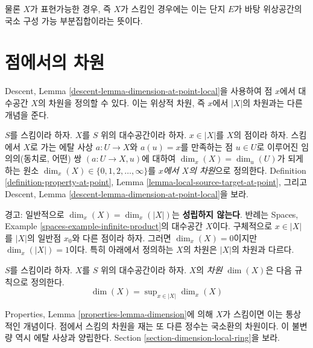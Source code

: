 \noindent
물론 $X$가 표현가능한 경우, 즉 $X$가 스킴인 경우에는 이는 단지
$E$가 바탕 위상공간의 국소 구성 가능 부분집합이라는 뜻이다.







\section{점에서의 차원}
\label{section-dimension}

\noindent
Descent, Lemma \ref{descent-lemma-dimension-at-point-local}을 사용하여
점 $x$에서 대수공간 $X$의 차원을 정의할 수 있다. 이는 위상적 차원,
즉 $x$에서 $|X|$의 차원과는 다른 개념을 준다.

\begin{definition}
\label{definition-dimension-at-point}
$S$를 스킴이라 하자.
$X$를 $S$ 위의 대수공간이라 하자.
$x \in |X|$를 $X$의 점이라 하자.
스킴에서 $X$로 가는 에탈 사상 $a : U \to X$와 $a(u) = x$를 만족하는
점 $u \in U$로 이루어진 임의의(동치로, 어떤) 쌍
$(a : U \to X, u)$에 대하여 $\dim_x(X) = \dim_u(U)$가 되게 하는 원소
$\dim_x(X) \in \{0, 1, 2, \ldots, \infty\}$를
{\it $x$에서 $X$의 차원}으로 정의한다. Definition
\ref{definition-property-at-point}, Lemma
\ref{lemma-local-source-target-at-point}, 그리고 Descent, Lemma
\ref{descent-lemma-dimension-at-point-local}을 보라.
\end{definition}

\noindent
경고: 일반적으로 $\dim_x(X) = \dim_x(|X|)$는 {\bf 성립하지 않는다}.
반례는 Spaces, Example \ref{spaces-example-infinite-product}의
대수공간 $X$이다. 구체적으로 $x \in |X|$를 $|X|$의 일반점 $x_0$와
다른 점이라 하자. 그러면 $\dim_x(X) = 0$이지만
$\dim_x(|X|) = 1$이다. 특히 아래에서 정의하는 $X$의 차원은
$|X|$의 차원과 다르다.

\begin{definition}
\label{definition-dimension}
$S$를 스킴이라 하자. $X$를 $S$ 위의 대수공간이라 하자.
$X$의 {\it 차원} $\dim(X)$은 다음 규칙으로 정의한다.
$$
\dim(X) = \sup\nolimits_{x \in |X|} \dim_x(X)
$$
\end{definition}

\noindent
Properties, Lemma \ref{properties-lemma-dimension}에 의해 $X$가 스킴이면
이는 통상적인 개념이다. 점에서 스킴의 차원을 재는 또 다른 정수는
국소환의 차원이다. 이 불변량 역시 에탈 사상과 양립한다.
Section \ref{section-dimension-local-ring}을 보라.






